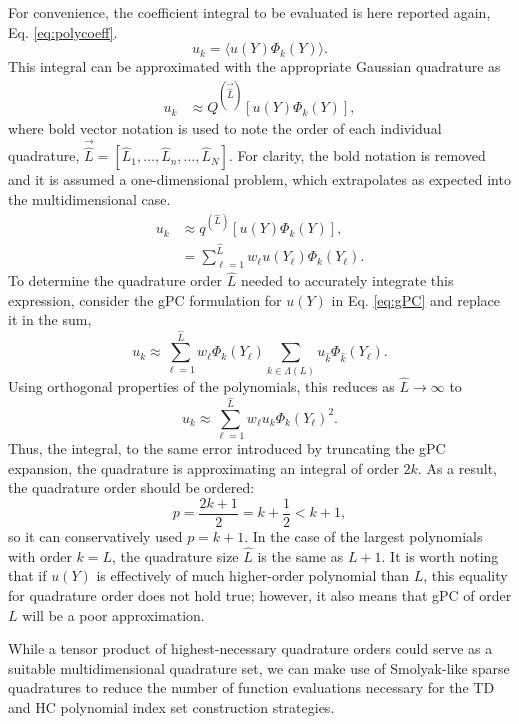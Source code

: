 For convenience, the coefficient integral to be evaluated is here reported again, Eq.
\ref{eq:polycoeff}.
\begin{equation}
  u_k = \langle u(Y)\Phi_k(Y) \rangle.
\end{equation}
This integral can be approximated with the appropriate Gaussian quadrature as
\begin{align}
  u_k &\approx Q^{(\vec{\hat L})}[u(Y)\Phi_k(Y)],
\end{align}
where bold vector notation is used to note the order of each individual quadrature,
$\vec{\hat L} = [\hat L_1, \ldots,\hat L_n,\ldots,\hat L_N]$. For clarity, the bold notation is removed and
it is assumed a one-dimensional problem, which extrapolates as expected into the multidimensional case.
\begin{align}
  u_k &\approx q^{(\hat L)}[u(Y)\Phi_k(Y)],\\
      &= \sum_{\ell=1}^{\hat L} w_\ell u(Y_\ell)\Phi_k(Y_\ell).
\end{align}
To determine the quadrature order $\hat L$ needed to accurately integrate this expression, consider the
gPC formulation for $u(Y)$ in Eq. \ref{eq:gPC} and replace it in the sum,
\begin{equation}
  u_k\approx \sum_{\ell=1}^{\hat L} w_\ell \Phi_k(Y_\ell) \sum_{k\in\Lambda(L)}u_{\hat k}\Phi_{\hat k}(Y_\ell).
\end{equation}
Using orthogonal properties of the polynomials, this reduces as $\hat L\to\infty$ to
\begin{equation}
  u_k\approx \sum_{\ell=1}^{\hat L} w_\ell u_k \Phi_k(Y_\ell)^2.
\end{equation}
Thus, the integral, to the same error introduced by truncating the  gPC expansion, the quadrature is
approximating an integral of order $2k$. As a result, the quadrature order should be ordered: 
\begin{equation}
  p=\frac{2k+1}{2}=k+\frac{1}{2}<k+1,
\end{equation}
so it  can conservatively used  $p=k+1$.  In the case of the largest polynomials with order
$k=L$, the quadrature size $\hat L$ is the same as $L+1$.  It is worth noting that if $u(Y)$ is effectively of
much higher-order polynomial than $L$, this equality for quadrature order does not hold true; however, it also
means that gPC of order $L$ will be a poor approximation.

While a tensor product of highest-necessary quadrature orders could serve as a suitable multidimensional
quadrature set, we can make use of Smolyak-like sparse quadratures to reduce the number of function
evaluations necessary for the TD and HC polynomial index set construction strategies.

